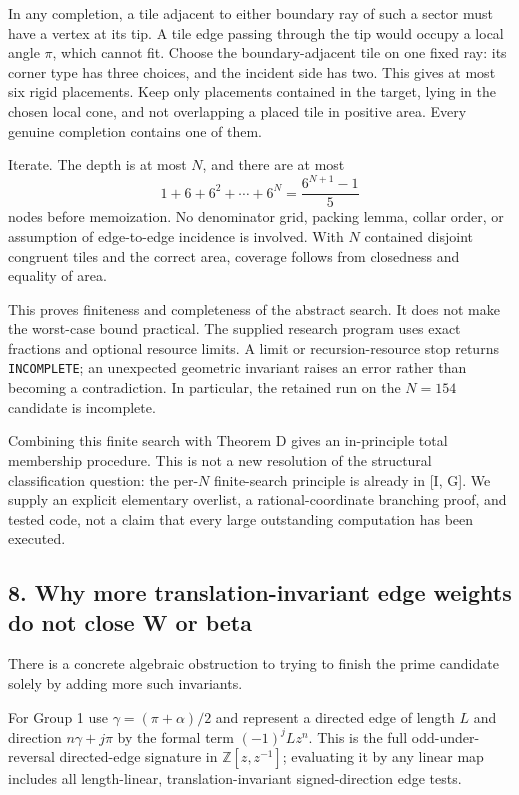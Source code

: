\documentclass[
  11pt,
]{article}
\begin{document}
In any completion, a tile adjacent to either boundary ray of such a
sector must have a vertex at its tip. A tile edge passing through the
tip would occupy a local angle \(\pi\), which cannot fit. Choose the
boundary-adjacent tile on one fixed ray: its corner type has three
choices, and the incident side has two. This gives at most six rigid
placements. Keep only placements contained in the target, lying in the
chosen local cone, and not overlapping a placed tile in positive area.
Every genuine completion contains one of them.

Iterate. The depth is at most \(N\), and there are at most
\[1+6+6^2+\cdots+6^N=\frac{6^{N+1}-1}{5}\] nodes before memoization. No
denominator grid, packing lemma, collar order, or assumption of
edge-to-edge incidence is involved. With \(N\) contained disjoint
congruent tiles and the correct area, coverage follows from closedness
and equality of area.

This proves finiteness and completeness of the abstract search. It does
not make the worst-case bound practical. The supplied research program
uses exact fractions and optional resource limits. A limit or
recursion-resource stop returns \texttt{INCOMPLETE}; an unexpected
geometric invariant raises an error rather than becoming a
contradiction. In particular, the retained run on the \(N=154\)
candidate is incomplete.

Combining this finite search with Theorem D gives an in-principle total
membership procedure. This is not a new resolution of the structural
classification question: the per-\(N\) finite-search principle is
already in {[}I, G{]}. We supply an explicit elementary overlist, a
rational-coordinate branching proof, and tested code, not a claim that
every large outstanding computation has been executed.

\subsection{8. Why more translation-invariant edge weights do not close
W or
beta}\label{why-more-translation-invariant-edge-weights-do-not-close-w-or-beta}

There is a concrete algebraic obstruction to trying to finish the prime
candidate solely by adding more such invariants.

For Group 1 use \(\gamma=(\pi+\alpha)/2\) and represent a directed edge
of length \(L\) and direction \(n\gamma+j\pi\) by the formal term
\((-1)^j Lz^n\). This is the full odd-under-reversal directed-edge
signature in \(\mathbb Z[z,z^{-1}]\); evaluating it by any linear map
includes all length-linear, translation-invariant signed-direction edge
tests.
\end{document}
